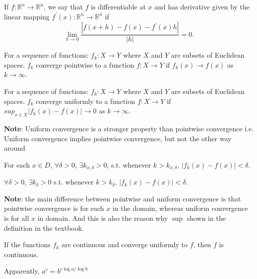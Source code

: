 \begin{definition}[Differentiable]
    If $f: \mathbb{R}^{n} \rightarrow \mathbb{R}^{n}$, we say that $f$ is 
    differentiable at $x$ and has derivative given by the linear mapping 
    $f^{\prime}(x): \mathbb{R}^{n} \rightarrow \mathbb{R}^{n}$ if
$$
\lim _{h \rightarrow 0} \frac{\left|f(x+h)-f(x)-f^{\prime}(x) h\right|}{|h|}=0 .
$$
\end{definition}

\begin{definition}
    For a sequence of functions: $f_k : X\rightarrow Y$ where $X$ and $Y$ are subsets 
    of Euclidean spaces. $f_k$ converge pointwise to a function $f:X\rightarrow Y$ if 
    $f_k(x)\rightarrow f(x)$ as $k\rightarrow \infty$.
\end{definition}

\begin{definition}
    For a sequence of functions: $f_k : X\rightarrow Y$ where $X$ and $Y$ are subsets 
    of Euclidean spaces. $f_k$ converge uniformly to a function $f:X\rightarrow Y$ if 
    $sup_{x\in X} |f_k(x)- f(x)| \rightarrow 0$ as $k\rightarrow \infty$.
\end{definition}

\textbf{Note}: Uniform convergence is a stronger property than pointwise convergence i.e. Uniform convergence implies pointwise convergence, but not the other way around

\begin{definition}
For each $x\in D$, $\forall\delta > 0$, $\exists k_{x, \delta}>0$, s.t. whenever $k > k_{x, \delta}$, $|f_k(x)-f(x)| < \delta$.
\end{definition}

\begin{definition}
$\forall\delta >0$, $\exists k_\delta>0$ s.t. whenever $k>k_\delta$, $|f_k(x) - f(x)|<\delta$.
\end{definition}

\textbf{Note}: the main difference between pointwise and uniform convergence is that pointwise convergence is for each $x$ in the domain, whereas uniform convergence is for all $x$ in domain. And this is also the reason why $\sup$ shown in the definition in the textbook.



\begin{theorem}
    If the functions $f_k$ are continuous and converge uniformly to $f$, then $f$ is continuous. 
\end{theorem}


\begin{theorem}[Logarithms]
    Apparently, $a^c = b^{c\log a / \log b}$
\end{theorem}
